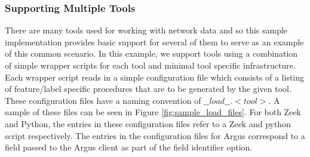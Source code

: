 \documentclass[sigconf]{acmart}
\begin{document}
\subsubsection{Supporting Multiple Tools}\label{subsubsec:tool_support}
There are many tools used for working with network data and so this sample implementation provides basic support for several of them to serve as an example of this common scenario.
In this example, we support tools using a combination of simple wrapper scripts for each tool and minimal tool specific infrastructure.
Each wrapper script reads in a simple configuration file which consists of a listing of feature/label specific procedures that are to be generated by the given tool.
These configuration files have a naming convention of $\_\_load\_\_.<tool>$.
A sample of these files can be seen in Figure \ref{fig:sample_load_files}.
For both Zeek and Python, the entries in these configuration files refer to a Zeek and python script respectively.
The entries in the configuration files for Argus correspond to a field passed to the Argus client as part of the field identifier option.
\end{document}
